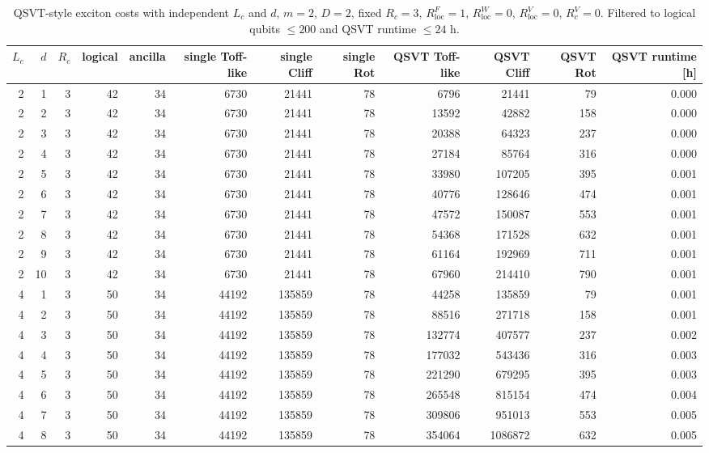 \begin{table}[t]
\centering
\scriptsize
\caption{QSVT-style exciton costs with independent $L_c$ and $d$, $m=2$, $D=2$, fixed $R_c=3$, $R_{\mathrm{loc}}^F=1$, $R_{\mathrm{loc}}^W=0$, $R_{\mathrm{loc}}^V=0$, $R_c^V=0$. Filtered to logical qubits $\leq 200$ and QSVT runtime $\leq 24$ h.}
\begin{tabularx}{\linewidth}{rrrrrrrrrrrr}
\toprule
$L_c$ & $d$ & $R_c$ & logical & ancilla & single Toff-like & single Cliff & single Rot & QSVT Toff-like & QSVT Cliff & QSVT Rot & QSVT runtime [h] \\
\midrule
2 & 1 & 3 & 42 & 34 & 6730 & 21441 & 78 & 6796 & 21441 & 79 & 0.000 \\
2 & 2 & 3 & 42 & 34 & 6730 & 21441 & 78 & 13592 & 42882 & 158 & 0.000 \\
2 & 3 & 3 & 42 & 34 & 6730 & 21441 & 78 & 20388 & 64323 & 237 & 0.000 \\
2 & 4 & 3 & 42 & 34 & 6730 & 21441 & 78 & 27184 & 85764 & 316 & 0.000 \\
2 & 5 & 3 & 42 & 34 & 6730 & 21441 & 78 & 33980 & 107205 & 395 & 0.001 \\
2 & 6 & 3 & 42 & 34 & 6730 & 21441 & 78 & 40776 & 128646 & 474 & 0.001 \\
2 & 7 & 3 & 42 & 34 & 6730 & 21441 & 78 & 47572 & 150087 & 553 & 0.001 \\
2 & 8 & 3 & 42 & 34 & 6730 & 21441 & 78 & 54368 & 171528 & 632 & 0.001 \\
2 & 9 & 3 & 42 & 34 & 6730 & 21441 & 78 & 61164 & 192969 & 711 & 0.001 \\
2 & 10 & 3 & 42 & 34 & 6730 & 21441 & 78 & 67960 & 214410 & 790 & 0.001 \\
4 & 1 & 3 & 50 & 34 & 44192 & 135859 & 78 & 44258 & 135859 & 79 & 0.001 \\
4 & 2 & 3 & 50 & 34 & 44192 & 135859 & 78 & 88516 & 271718 & 158 & 0.001 \\
4 & 3 & 3 & 50 & 34 & 44192 & 135859 & 78 & 132774 & 407577 & 237 & 0.002 \\
4 & 4 & 3 & 50 & 34 & 44192 & 135859 & 78 & 177032 & 543436 & 316 & 0.003 \\
4 & 5 & 3 & 50 & 34 & 44192 & 135859 & 78 & 221290 & 679295 & 395 & 0.003 \\
4 & 6 & 3 & 50 & 34 & 44192 & 135859 & 78 & 265548 & 815154 & 474 & 0.004 \\
4 & 7 & 3 & 50 & 34 & 44192 & 135859 & 78 & 309806 & 951013 & 553 & 0.005 \\
4 & 8 & 3 & 50 & 34 & 44192 & 135859 & 78 & 354064 & 1086872 & 632 & 0.005 \\

\end{tabularx}
\end{table}
